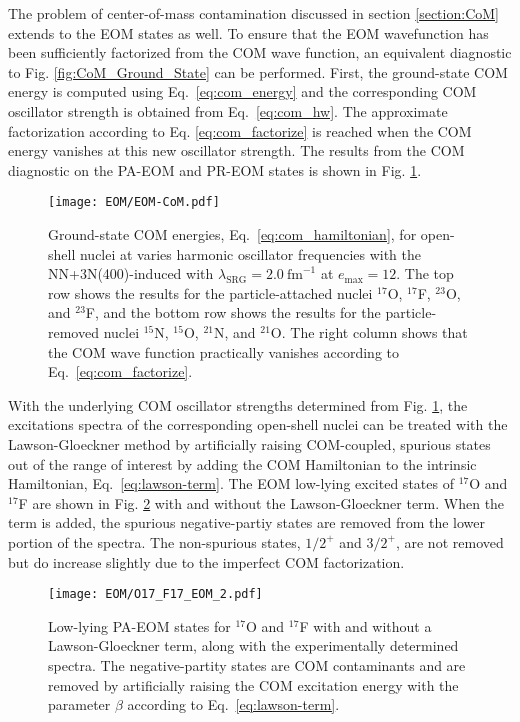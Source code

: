 \documentclass[thesis.tex]{subfiles}
\begin{document}
The problem of center-of-mass contamination discussed in section \ref{section:CoM} extends to the EOM states as well.  To ensure that the EOM wavefunction has been sufficiently factorized from the COM wave function, an equivalent diagnostic to Fig. \ref{fig:CoM_Ground_State} can be performed.  First, the ground-state COM energy is computed using Eq.\ \eqref{eq:com_energy} and the corresponding COM oscillator strength is obtained from Eq.\ \eqref{eq:com_hw}.  The approximate factorization according to Eq. \eqref{eq:com_factorize} is reached when the COM energy vanishes at this new oscillator strength.  The results from the COM diagnostic on the PA-EOM and PR-EOM states is shown in Fig. \ref{fig:EOM_COM}.
\begin{figure}[h]
  \texttt{[image: EOM/EOM-CoM.pdf]}
  \caption{Ground-state COM energies, Eq.\ \eqref{eq:com_hamiltonian}, for open-shell nuclei at varies harmonic oscillator frequencies with the NN+3N(400)-induced with $\lambda_{\mathrm{SRG}}=2.0\ \mathrm{fm}^{-1}$ at $e_{\mathrm{max}}=12$.  The top row shows the results for the particle-attached nuclei ${}^{17}$O, ${}^{17}$F, ${}^{23}$O, and ${}^{23}$F, and the bottom row shows the results for the particle-removed nuclei ${}^{15}$N, ${}^{15}$O, ${}^{21}$N, and ${}^{21}$O.  The right column shows that the COM wave function practically vanishes according to Eq.\ \eqref{eq:com_factorize}.}
  \label{fig:EOM_COM}
\end{figure}

With the underlying COM oscillator strengths determined from Fig. \ref{fig:EOM_COM}, the excitations spectra of the corresponding open-shell nuclei can be treated with the Lawson-Gloeckner method \cite{GLOECKNER1974313} by artificially raising COM-coupled, spurious states out of the range of interest by adding the COM Hamiltonian to the intrinsic Hamiltonian, Eq.\ \eqref{eq:lawson-term}.  The EOM low-lying excited states of $^{17}$O and $^{17}$F are shown in Fig. \ref{fig:O17F17_spectra} with and without the Lawson-Gloeckner term.  When the term is added, the spurious negative-partiy states are removed from the lower portion of the spectra.  The non-spurious states, $1/2^{+}$ and $3/2^{+}$, are not removed but do increase slightly due to the imperfect COM factorization.

\begin{figure}
  \texttt{[image: EOM/O17\_F17\_EOM\_2.pdf]}
  \caption{Low-lying PA-EOM states for $^{17}$O and $^{17}$F with and without a Lawson-Gloeckner term, along with the experimentally determined spectra.  The negative-partity states are COM contaminants and are removed by artificially raising the COM excitation energy with the parameter $\beta$ according to Eq.\ \eqref{eq:lawson-term}.}
  \label{fig:O17F17_spectra}
\end{figure}
\end{document}
